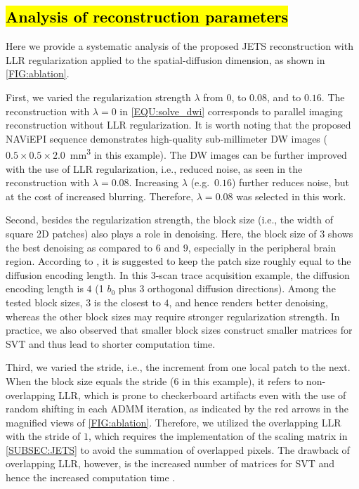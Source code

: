 \documentclass[preprint,12pt,authoryear,review]{elsarticle}
\begin{document}
    \subsection{\hl{Analysis of reconstruction parameters}}

    Here we provide a systematic analysis of
    the proposed JETS reconstruction
    with LLR regularization applied to
    the spatial-diffusion dimension, as shown in \cref{FIG:ablation}.

    First, we varied the regularization strength $\lambda$
    from $0$, to $0.08$, and to $0.16$.
    The reconstruction with $\lambda = 0$ in \cref{EQU:solve_dwi}
    corresponds to parallel imaging reconstruction
    without LLR regularization.
    It is worth noting that the proposed NAViEPI sequence
    demonstrates high-quality sub-millimeter DW images
    ($0.5\times0.5\times2.0$~\si{\cubic\mm} in this example).
    The DW images can be further improved
    with the use of LLR regularization, i.e., reduced noise,
    as seen in the reconstruction with $\lambda=0.08$.
    Increasing $\lambda$ (e.g.~$0.16$) further reduces noise,
    but at the cost of increased blurring.
    Therefore, $\lambda=0.08$ was selected in this work.

    Second, besides the regularization strength,
    the block size (i.e., the width of square 2D patches) also
    plays a role in denoising.
    Here, the block size of $3$ shows the best denoising
    as compared to $6$ and $9$,
    especially in the peripheral brain region.
    According to \citep{cordero_2019_cplxdwi},
    it is suggested to keep the patch size roughly equal to
    the diffusion encoding length.
    In this 3-scan trace acquisition example,
    the diffusion encoding length is $4$
    (1 $b_0$ plus 3 orthogonal diffusion directions).
    Among the tested block sizes, $3$ is the closest to $4$,
    and hence renders better denoising,
    whereas the other block sizes may require stronger
    regularization strength.
    In practice, we also observed that smaller block sizes
    construct smaller matrices for SVT and thus
    lead to shorter computation time.

    Third, we varied the stride, i.e.,
    the increment from one local patch to the next.
    When the block size equals the stride ($6$ in this example),
    it refers to non-overlapping LLR,
    which is prone to checkerboard artifacts
    even with the use of random shifting \citep{saucedo_2017_randomshift}
    in each ADMM iteration,
    as indicated by the red arrows in the magnified views
    of \cref{FIG:ablation}.
    Therefore, we utilized the overlapping LLR with the stride of $1$,
    which requires the implementation of the scaling matrix
    in \cref{SUBSEC:JETS} to avoid the summation of overlapped pixels.
    The drawback of overlapping LLR, however, is the increased number
    of matrices for SVT and hence the increased computation time
    \citep{saucedo_2017_randomshift}.
\end{document}

